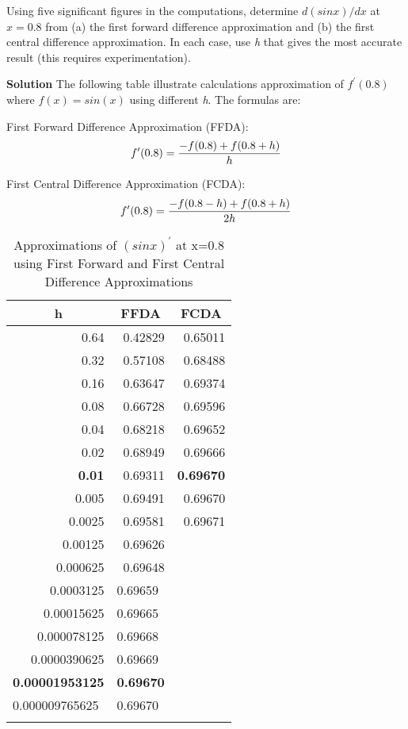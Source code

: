 \begin{exercise}{5}
Using five significant figures in the computations, determine \(d(sin x)/dx\) at \(x = 0.8\) from (a) the first forward difference approximation and (b) the first central difference approximation. In each case, use \textit{h} that gives the most accurate result (this requires experimentation).

\textbf{Solution}
The following table illustrate calculations approximation of $f^\prime(0.8)$ where $f(x)=sin(x)$ using different \textit{h}.
The formulas are:

First Forward Difference Approximation (FFDA):
\begin{align}
f^\prime(0.8) = \frac{-f(0.8) + f(0.8+h)}{h} \notag    
\end{align}

First Central Difference Approximation (FCDA):
\begin{align}
f^\prime(0.8) = \frac{-f(0.8-h) + f(0.8+h)}{2h} \notag    
\end{align}
\begin{longtable}[c]{|r|r|r|}
\hline
\multicolumn{1}{|c|}{\textbf{h}} & \multicolumn{1}{c|}{\textbf{FFDA}} & \multicolumn{1}{c|}{\textbf{FCDA}} \\ \hline
\endfirsthead
%
\endhead
%
0.64 & 0.42829 & 0.65011 \\ \hline
0.32 & 0.57108 & 0.68488 \\ \hline
0.16 & 0.63647 & 0.69374 \\ \hline
0.08 & 0.66728 & 0.69596 \\ \hline
0.04 & 0.68218 & 0.69652 \\ \hline
0.02 & 0.68949 & 0.69666 \\ \hline
\textbf{0.01} & 0.69311 & \textbf{0.69670} \\ \hline
0.005 & 0.69491 & 0.69670 \\ \hline
0.0025 & 0.69581 & 0.69671 \\ \hline
0.00125 & 0.69626 &  \\ \hline
0.000625 & 0.69648 &  \\ \hline
0.0003125 & \multicolumn{1}{l|}{0.69659} & \multicolumn{1}{l|}{} \\ \hline
0.00015625 & \multicolumn{1}{l|}{0.69665} & \multicolumn{1}{l|}{} \\ \hline
0.000078125 & \multicolumn{1}{l|}{0.69668} & \multicolumn{1}{l|}{} \\ \hline
0.0000390625 & \multicolumn{1}{l|}{0.69669} & \multicolumn{1}{l|}{} \\ \hline
\textbf{0.00001953125} & \multicolumn{1}{l|}{\textbf{0.69670}} & \multicolumn{1}{l|}{} \\ \hline
\multicolumn{1}{|l|}{0.000009765625} & \multicolumn{1}{l|}{0.69670} & \multicolumn{1}{l|}{} \\ \hline
\caption{Approximations of $(sinx)^\prime$ at x=0.8 using First Forward and First Central Difference Approximations}


\end{longtable}
\end{exercise}
